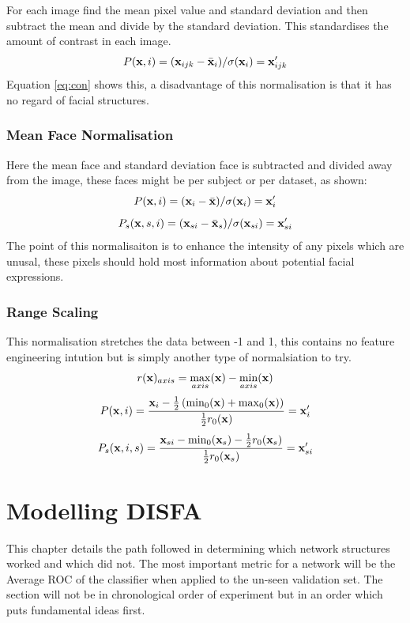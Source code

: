 \documentclass[11pt,twoside]{report}
\begin{document}
For each image find the mean pixel value and standard deviation and then subtract the mean
and divide by the standard deviation. This standardises the amount of contrast in each image.
\begin{equation}
   P({\bf x},i)= ({\bf x}_{ijk} - \bar {\bf x}_{i})/\sigma ({\bf x}_{i}) = {\bf x}_{ijk}'
   \label{eq:con}
\end{equation}
Equation \ref{eq:con} shows this, a disadvantage of this normalisation is that it
has no regard of facial structures.
\subsection{Mean Face Normalisation}
Here the mean face and standard deviation face is subtracted and divided away from the
image, these faces might be per subject or per dataset, as shown:
\begin{equation}
  P({\bf x},i) =  ({\bf x}_{i} - \bar {\bf x})/\sigma ({\bf x}_{i})  = {\bf x}_{i}'
\end{equation}
\begin{equation}
  P_s({\bf x},s,i) = ({\bf x}_{si} - \bar {\bf x}_s)/\sigma ({\bf x}_{si})  = {\bf x}_{si}'
\end{equation}
The point of this normalisaiton is to enhance the intensity of any pixels which
are unusal, these pixels should hold most information about potential facial expressions.
\subsection{Range Scaling}
This normalisation stretches the data between -1 and 1, this contains no feature engineering
intution but is simply another type of normalsiation to try.
\begin{equation}
  r({\bf x})_{axis} = \max_{axis}({\bf x}) - \min_{axis}({\bf x})
\end{equation}
\begin{equation}
   P({\bf x},i) =
   \frac{{\bf x}_{i} - \frac{1}{2}\left ( \min_0({\bf x}) + \max_0({\bf x}) \right ) }{\frac{1}{2}r_0({\bf x})}
   = {\bf x}_{i}'
\end{equation}
\begin{equation}
   P_s({\bf x},i,s) =
   \frac{{\bf x}_{si} - \min_0({\bf x}_s) - \frac{1}{2}r_0({\bf x}_s) }{\frac{1}{2}r_0({\bf x}_s)}
   = {\bf x}_{si}'
\end{equation}


\chapter{Modelling DISFA}
This chapter details the path followed in determining which network structures worked and
which did not. The most important metric for a network will be the Average ROC of the classifier
when applied to the un-seen validation set. The section will not be in chronological order of
experiment but in an order which puts fundamental ideas first.
\end{document}
